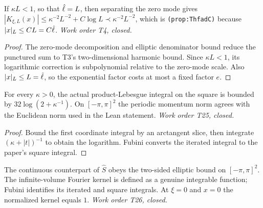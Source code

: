\begin{lemma}\label{lem:decay-small}
  \leanok
  If $\kappa L<1$, so that $\hat\ell=L$, then separating the zero mode gives
  $|K_{\xi,L}(x)|\le\kappa^{-2}L^{-2}+C\log L\prec\kappa^{-2}L^{-2}$, which is
  \texttt{(prop:ThfadC)} because $|x|_L\le CL=C\hat\ell$.
  \emph{Work order T4, closed.}
\end{lemma}
\begin{proof}\leanok
  The zero-mode decomposition and elliptic denominator bound reduce the
  punctured sum to T3's two-dimensional harmonic bound.  Since
  $\kappa L<1$, its logarithmic correction is subpolynomial relative to the
  zero-mode scale.  Also $|x|_L\le L=\hat\ell$, so the exponential factor costs
  at most a fixed factor $e$.
\end{proof}

\begin{lemma}
  \label{lem:log-integral}
  \leanok
  For every $\kappa>0$, the actual product-Lebesgue integral on the square is
  bounded by $32\log(2+\kappa^{-1})$.  On $[-\pi,\pi]^2$ the periodic
  momentum norm agrees with the Euclidean norm used in the Lean statement.
  \emph{Work order T25, closed.}
\end{lemma}
\begin{proof}\leanok
  Bound the first coordinate integral by an arctangent slice, then integrate
  $(\kappa+|t|)^{-1}$ to obtain the logarithm.  Fubini converts the iterated
  integral to the paper's square integral.
\end{proof}

\begin{definition}
  \label{def:continuum}
  \leanok
  The continuous counterpart of $\widehat S$ obeys the two-sided elliptic
  bound on $[-\pi,\pi]^2$.  The infinite-volume Fourier kernel is defined as
  a genuine integrable function; Fubini identifies its iterated and square
  integrals.  At $\xi=0$ and $x=0$ the normalized kernel equals $1$.
  \emph{Work order T26, closed.}
\end{definition}

